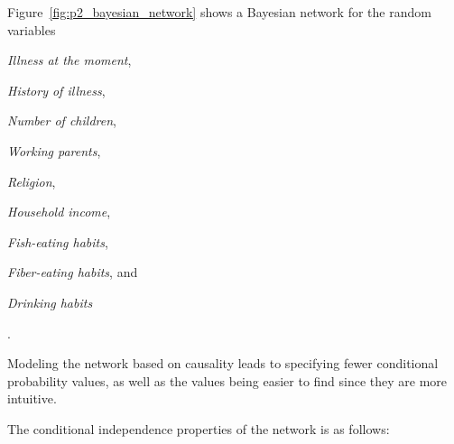 \setlength\parindent{17pt}
Figure~\ref{fig:p2_bayesian_network} shows a Bayesian network for the random variables
\begin{inparaenum}[1)]
\item \textit{Illness at the moment},
\item \textit{History of illness},
\item \textit{Number of children},
\item \textit{Working parents},
\item \textit{Religion},
\item \textit{Household income},
\item \textit{Fish-eating habits},
\item \textit{Fiber-eating habits}, and
\item \textit{Drinking habits}
\end{inparaenum}.

Modeling the network based on causality leads to specifying fewer conditional probability values, as well as the values being easier to find since they are more intuitive.

The conditional independence properties of the network is as follows:
\setlength\parindent{0pt}

